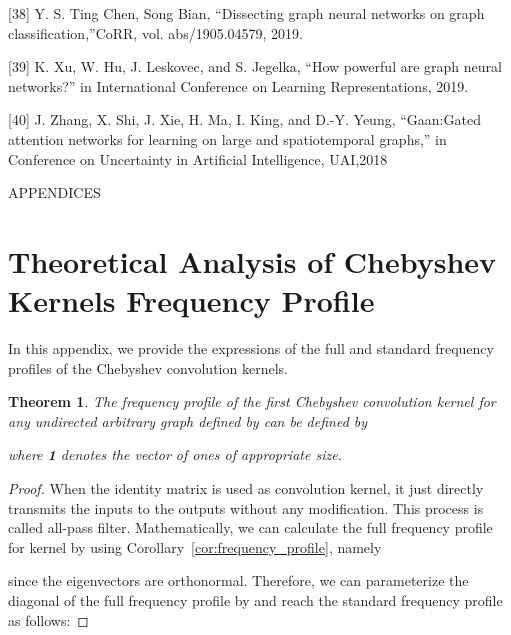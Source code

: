 \documentclass{article}
\newtheorem{theorem}{Theorem}
\begin{document}
[38]  Y. S. Ting Chen, Song Bian, “Dissecting graph neural networks on graph classification,”CoRR, vol. abs/1905.04579, 2019.

[39]  K.  Xu,  W.  Hu,  J.  Leskovec,  and  S.  Jegelka,  “How  powerful  are graph  neural  networks?”  in International  Conference  on  Learning Representations, 2019.

[40]  J.  Zhang,  X.  Shi,  J.  Xie,  H.  Ma,  I.  King,  and  D.-Y.  Yeung,  “Gaan:Gated attention networks for learning on large and spatiotemporal graphs,” in Conference on Uncertainty in Artificial Intelligence, UAI,2018



\clearpage

\begin{@twocolumnfalse}
 \Large


 \begin{center}
 \noindent APPENDICES 
\end{center}
 \end{@twocolumnfalse}






\setcounter{section}{0}
\def\thesection{\Alph{section}}
\setcounter{table}{0}
\renewcommand{\thetable}{A\arabic{table}}



\section{Theoretical Analysis of Chebyshev Kernels Frequency Profile}
\label{section:chebdetails}

In this appendix, we provide the expressions of the full and standard frequency profiles of the Chebyshev convolution kernels.

\begin{theorem}
  \label{Th:thch1}
The frequency profile of the first Chebyshev convolution kernel for any undirected arbitrary graph defined by  can be defined by

where {\bf1} denotes the vector of ones of appropriate size.
\end{theorem}

\begin{proof}
When the identity matrix is used as convolution kernel, it just directly transmits the inputs to the outputs without any modification. This process is called all-pass filter. 
Mathematically, we can calculate the full frequency profile for kernel  by using Corollary~\ref{cor:frequency_profile}, namely

since the eigenvectors are orthonormal. Therefore, we can parameterize the diagonal of the full frequency profile by  and reach the standard frequency profile as follows:

\end{proof}
\end{document}
